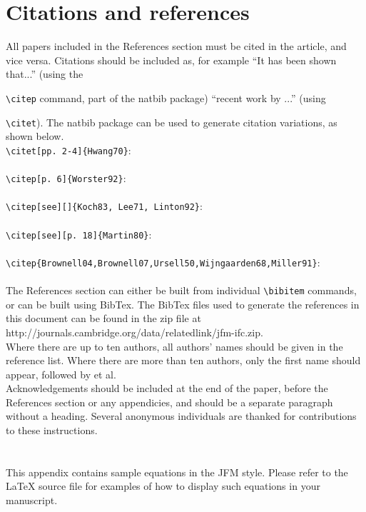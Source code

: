 \documentclass{jfm}
\begin{document}
{\section{Citations and references}
All papers included in the References section must be cited in the article, and vice versa. Citations should be included as, for example ``It has been shown \citep{Rogallo81} that...'' (using the {\verb}\citep} command, part of the natbib package) ``recent work by \citet{Dennis85}...'' (using {\verb}\citet}).
The natbib package can be used to generate citation variations, as shown below.\\
\verb#\citet[pp. 2-4]{Hwang70}#:\\
\citet[pp. 2-4]{Hwang70} \\
\verb#\citep[p. 6]{Worster92}#:\\
\citep[p. 6]{Worster92}\\
\verb#\citep[see][]{Koch83, Lee71, Linton92}#:\\
\citep[see][]{Koch83, Lee71, Linton92}\\
\verb#\citep[see][p. 18]{Martin80}#:\\
\citep[see][p. 18]{Martin80}\\
\verb#\citep{Brownell04,Brownell07,Ursell50,Wijngaarden68,Miller91}#:\\
\citep{Brownell04,Brownell07,Ursell50,Wijngaarden68,Miller91}\\
The References section can either be built from individual \verb#\bibitem# commands, or can be built using BibTex. The BibTex files used to generate the references in this document can be found in the zip file at http://journals.cambridge.org/\linebreak[3]data/\linebreak[3]relatedlink/\linebreak[3]jfm-ifc.zip.\\
Where there are up to ten authors, all authors' names should be given in the reference list. Where there are more than ten authors, only the first name should appear, followed by et al.\\

Acknowledgements should be included at the end of the paper, before the References section or any appendicies, and should be a separate paragraph without a heading. Several anonymous individuals are thanked for contributions to these instructions.

\appendix
\section{}\label{appA}
This appendix contains sample equations in the JFM style. Please refer to the {\LaTeX} source file for examples of how to display such equations in your manuscript.

}}}
\end{document}
